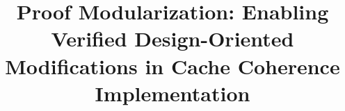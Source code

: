 
\title{Proof Modularization: Enabling Verified Design-Oriented Modifications in Cache Coherence Implementation}



\author{
}

\date{}

\maketitle %


\begin{abstract}

\end{abstract}





